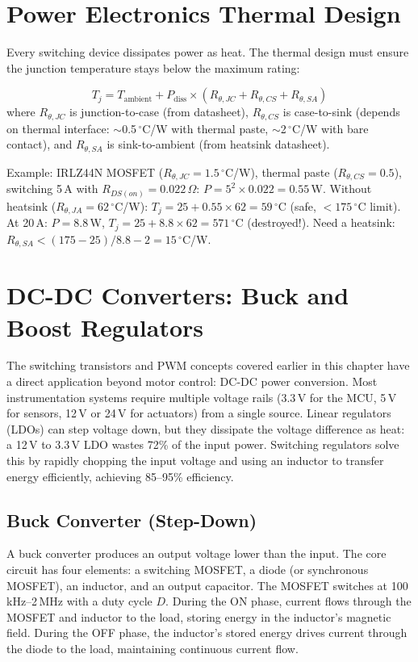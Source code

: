 \documentclass[11pt,letterpaper,twoside,openany]{book}
\newcommand{\degC}{\ensuremath{{}^{\circ}\text{C}}}
\begin{document}
\section{Power Electronics Thermal Design}
Every switching device dissipates power as heat. The thermal design must ensure the junction temperature stays below the maximum rating:

\begin{equation}
T_j = T_{\text{ambient}} + P_{\text{diss}} \times (R_{\theta,JC} + R_{\theta,CS} + R_{\theta,SA})
\end{equation}
where $R_{\theta,JC}$ is junction-to-case (from datasheet), $R_{\theta,CS}$ is case-to-sink (depends on thermal interface: $\sim$0.5\,\degC{}/W with thermal paste, $\sim$2\,\degC{}/W with bare contact), and $R_{\theta,SA}$ is sink-to-ambient (from heatsink datasheet).

Example: IRLZ44N MOSFET ($R_{\theta,JC} = 1.5$\,\degC{}/W), thermal paste ($R_{\theta,CS} = 0.5$), switching 5\,A with $R_{DS(on)} = 0.022\,\Omega$: $P = 5^2 \times 0.022 = 0.55$\,W. Without heatsink ($R_{\theta,JA} = 62$\,\degC{}/W): $T_j = 25 + 0.55 \times 62 = 59$\,\degC{} (safe, $< 175$\,\degC{} limit). At 20\,A: $P = 8.8$\,W, $T_j = 25 + 8.8 \times 62 = 571$\,\degC{} (destroyed!). Need a heatsink: $R_{\theta,SA} < (175-25)/8.8 - 2 = 15$\,\degC{}/W.
\section{DC-DC Converters: Buck and Boost Regulators}

The switching transistors and PWM concepts covered earlier in this chapter have a direct application beyond motor control: DC-DC power conversion. Most instrumentation systems require multiple voltage rails (3.3\,V for the MCU, 5\,V for sensors, 12\,V or 24\,V for actuators) from a single source. Linear regulators (LDOs) can step voltage down, but they dissipate the voltage difference as heat: a 12\,V to 3.3\,V LDO wastes 72\% of the input power. Switching regulators solve this by rapidly chopping the input voltage and using an inductor to transfer energy efficiently, achieving 85--95\% efficiency.

\subsection{Buck Converter (Step-Down)}
A buck converter produces an output voltage lower than the input. The core circuit has four elements: a switching MOSFET, a diode (or synchronous MOSFET), an inductor, and an output capacitor. The MOSFET switches at 100\,kHz--2\,MHz with a duty cycle $D$. During the ON phase, current flows through the MOSFET and inductor to the load, storing energy in the inductor's magnetic field. During the OFF phase, the inductor's stored energy drives current through the diode to the load, maintaining continuous current flow.
\end{document}
